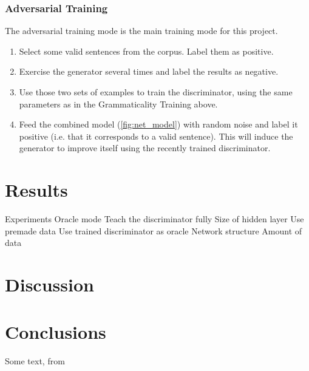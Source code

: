 \documentclass[12pt]{article}
\begin{document}
\subsubsection{Adversarial Training}

The adversarial training mode is the main training mode for this project.

\begin{enumerate}
    \item Select some valid sentences from the corpus. Label them as positive.
    \item Exercise the generator several times and label the results as negative.
    \item Use those two sets of examples to train the discriminator, using the same parameters as in the Grammaticality Training above.
    \item Feed the combined model (\ref{fig:net_model}) with random noise and label it positive (i.e. that it corresponds to a valid sentence). This will induce the generator to improve itself using the recently trained discriminator.
\end{enumerate}

\section{Results}
    Experiments
        Oracle mode
            Teach the discriminator fully
                Size of hidden layer
            Use premade data
            Use trained discriminator as oracle
        Network structure
        Amount of data

\section{Discussion}
\blindtext

\section{Conclusions}


Some text, from \cite{chollet2015keras}



\end{document}
